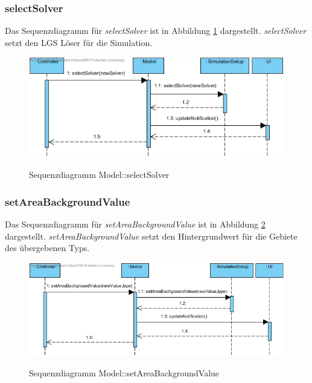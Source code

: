 \subsubsection*{selectSolver}

Das Sequenzdiagramm für \emph{selectSolver} ist in Abbildung \ref{Sequenzdiagramm Model::selectSolver} dargestellt. \emph{selectSolver} setzt den LGS Löser für die Simulation.

\begin{figure}[H]
	\centering
	\includegraphics[scale=.8]{Bilder/Model__selectSolver().jpg}\\
	\caption{Sequenzdiagramm Model::selectSolver}
	\label{Sequenzdiagramm Model::selectSolver}
\end{figure}

\subsubsection*{setAreaBackgroundValue}

Das Sequenzdiagramm für \emph{setAreaBackgroundValue} ist in Abbildung \ref{Sequenzdiagramm Model::setAreaBackgroundValue} dargestellt. \emph{setAreaBackgroundValue} setzt den Hintergrundwert für die Gebiete des übergebenen Typs.

\begin{figure}[H]
	\centering
	\includegraphics[scale=.8]{Bilder/Model__setAreaBackgroundValue().jpg}\\
	\caption{Sequenzdiagramm Model::setAreaBackgroundValue}
	\label{Sequenzdiagramm Model::setAreaBackgroundValue}
\end{figure}

